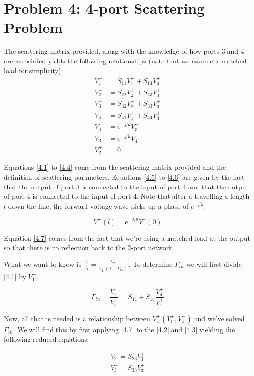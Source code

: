 \section*{Problem 4: 4-port Scattering Problem}
\setcounter{equation}{0}
\addtocounter{section}{1}
The scattering matrix provided, along with the knowledge of how ports 3 and 4
are associated yields the following relationships (note that we assume a matched
load for simplicity):
\begin{align}
    V_1^- &= S_{11}V_1^+ + S_{14}V_4^+ \label{4.1} \\
    V_2^- &= S_{22}V_2^+ + S_{23}V_3^+ \label{4.2} \\
    V_3^- &= S_{32}V_2^+ + S_{33}V_3^+ \label{4.3} \\
    V_4^- &= S_{41}V_1^+ + S_{44}V_4^+ \label{4.4} \\
    V_4^- &= e^{-j \beta l} V_3^+ \label{4.5}\\
    V_3^- &= e^{-j \beta l} V_4^+ \label{4.6} \\
    V_2^+ &= 0  \label{4.7}
\end{align}

Equations \ref{4.1} to \ref{4.4} come from the scattering matrix provided and
the definition of scattering parameters. Equations \ref{4.5} to \ref{4.6} are
given by the fact that the output of port 3 is connected to the input of port 4
and that the output of port 4 is connected to the input of port 4. Note that
after a travelling a length $l$ down the line, the forward voltage wave picks up
a phase of $e^{-j \beta l}$.

\[ 
        V^+(l) = e^{-j \beta l} V^+(0)
\]

Equation \ref{4.7} comes from the fact that we're using a matched load at the
output so that there is no reflection back to the 2-port network.

What we want to know is $\frac{V_2}{V_1} = \frac{V_2^-}{V_1^+(1+\Gamma_{in})}$.
To determine $\Gamma_{in}$ we will first divide \ref{4.1} by $V_1^+$.

\[ 
        \Gamma_{in} = \frac{V_1^-}{V_1^+} = S_{11} + S_{14}\frac{V_4^+}{V_1^+}
\]

Now, all that is needed is a relationship between $V_4^+(V_1^+,V_1^-)$ and we've
solved $\Gamma_{in}$. We will find this by first applying \ref{4.7} to the
\ref{4.2} and \ref{4.3} yielding the following reduced equations:

\begin{align}
    V_2^- = S_{23} V_3^+ \\
    V_3^- = S_{33} V_3^+ \label{v3rel}
\end{align}

